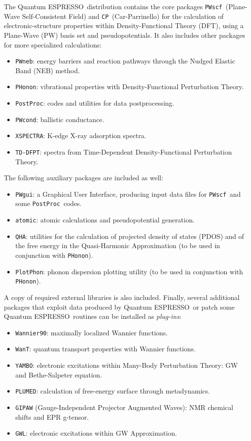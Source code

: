 \documentclass[12pt,a4paper]{article}
\def\qe{{\sc Quantum ESPRESSO}}
\def\PWscf{\texttt{PWscf}}
\def\PHonon{\texttt{PHonon}}
\def\CP{\texttt{CP}}
\def\PostProc{\texttt{PostProc}}
\def\NEB{\texttt{PWneb}} %
\begin{document}
The \qe\ distribution contains the core packages \PWscf\ (Plane-Wave 
Self-Consistent Field) and \CP\ (Car-Parrinello) for the calculation
of electronic-structure properties within
Density-Functional Theory (DFT), using a Plane-Wave (PW) basis set 
and pseudopotentials. It also includes other packages for
more specialized calculations:
\begin{itemize}
  \item \NEB:
        energy barriers and reaction pathways through the Nudged Elastic Band 
        (NEB) method.
  \item \PHonon:
        vibrational properties  with Density-Functional Perturbation Theory.
  \item \PostProc: 
        codes and utilities for data postprocessing.
  \item \texttt{PWcond}: 
        ballistic conductance.
  \item \texttt{XSPECTRA}:
        K-edge X-ray adsorption spectra.
  \item \texttt{TD-DFPT}:
        spectra from Time-Dependent 
        Density-Functional Perturbation Theory.
\end{itemize}
The following auxiliary packages are included as well:
\begin{itemize}
\item \texttt{PWgui}:
      a Graphical User Interface, producing input data files for 
      \PWscf\ and some \PostProc\ codes.
\item \texttt{atomic}:
      atomic calculations and pseudopotential generation.
\item \texttt{QHA}:
      utilities for the calculation of projected density of states (PDOS)
      and of the free energy in the Quasi-Harmonic Approximation (to be
      used in conjunction with \PHonon).
\item \texttt{PlotPhon}:
      phonon dispersion plotting utility (to be
      used in conjunction with \PHonon).
\end{itemize}
A copy of required external libraries is also included.
Finally, several additional packages that exploit data produced by \qe\ 
or patch some \qe\ routines can be installed as {\em plug-ins}:
\begin{itemize}
\item \texttt{Wannier90}:
      maximally localized Wannier functions.
\item \texttt{WanT}:
      quantum transport properties with Wannier functions.
\item \texttt{YAMBO}:
      electronic excitations within Many-Body Perturbation Theory:
      GW and Bethe-Salpeter equation.
\item \texttt{PLUMED}:
      calculation of free-energy surface through metadynamics.
\item \texttt{GIPAW} (Gauge-Independent Projector Augmented Waves):
      NMR chemical shifts and EPR g-tensor.
\item \texttt{GWL}: electronic excitations within GW Approximation.
\end{itemize}
\end{document}
